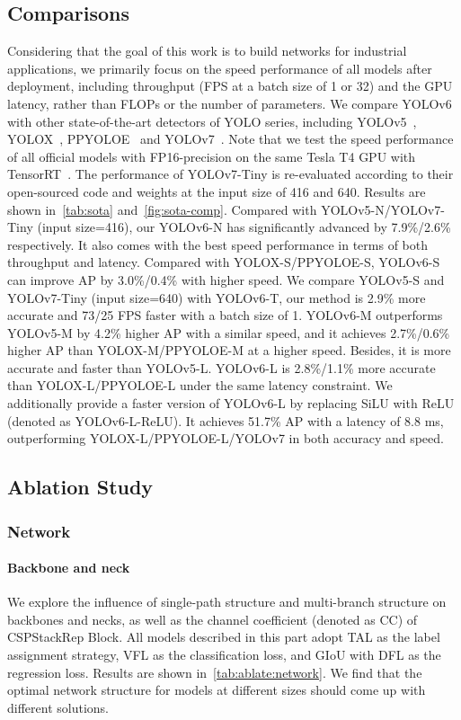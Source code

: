 \documentclass[10pt,twocolumn,letterpaper]{article}
\begin{document}
\subsection{Comparisons}
  Considering that the goal of this work is to build networks for industrial applications, we primarily focus on the speed performance of all models after deployment, including throughput (FPS at a batch size of 1 or 32) and the GPU latency, rather than FLOPs or the number of parameters. We compare YOLOv6 with other state-of-the-art detectors of YOLO series, including YOLOv5~\cite{yolov5}, YOLOX~\cite{ge2021yolox}, PPYOLOE~\cite{xu2022ppyoloe} and YOLOv7~\cite{wang2022yolov7}. Note that we test the speed performance of all official models with FP16-precision on the same Tesla T4 GPU with TensorRT~\cite{tensorrt}. The performance of YOLOv7-Tiny is re-evaluated according to their open-sourced code and weights at the input size of 416 and 640. Results are shown in~\cref{tab:sota} and~\cref{fig:sota-comp}. Compared with YOLOv5-N/YOLOv7-Tiny (input size=416), our YOLOv6-N has significantly advanced by 7.9\%/2.6\% respectively. It also comes with the best speed performance in terms of both throughput and latency. Compared with YOLOX-S/PPYOLOE-S, YOLOv6-S can improve AP by 3.0\%/0.4\% with higher speed. We compare YOLOv5-S and YOLOv7-Tiny (input size=640) with YOLOv6-T, our method is 2.9\% more accurate and 73/25 FPS faster with a batch size of 1. YOLOv6-M outperforms YOLOv5-M by 4.2\% higher AP with a similar speed, and it achieves 2.7\%/0.6\% higher AP than YOLOX-M/PPYOLOE-M at a higher speed. Besides, it is more accurate and faster than YOLOv5-L.  YOLOv6-L is 2.8\%/1.1\% more accurate than YOLOX-L/PPYOLOE-L under the same latency constraint. We additionally provide a faster version of YOLOv6-L by replacing SiLU with ReLU (denoted as YOLOv6-L-ReLU). It achieves 51.7\% AP with a latency of 8.8 ms, outperforming YOLOX-L/PPYOLOE-L/YOLOv7 in both accuracy and speed.
    

\subsection{Ablation Study}
\subsubsection{Network}
\paragraph{Backbone and neck}
  We explore the influence of single-path structure and multi-branch structure on backbones and necks, as well as the channel coefficient (denoted as CC) of CSPStackRep Block. All models described in this part adopt TAL as the label assignment strategy, VFL as the classification loss, and GIoU with DFL as the regression loss. Results are shown in~\cref{tab:ablate:network}. We find that the optimal network structure for models at different sizes should come up with different solutions. 
\end{document}
